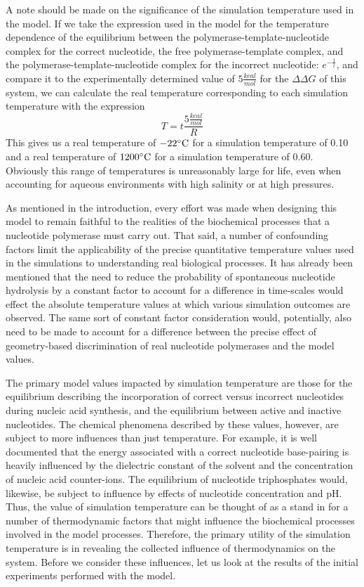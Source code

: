 A note should be made on the significance of the simulation temperature used in the model. If we take the expression used in the model for the temperature dependence of the equilibrium between the polymerase-template-nucleotide complex for the correct nucleotide, the free polymerase-template complex, and the polymerase-template-nucleotide complex for the incorrect nucleotide: $e^{-\frac{1}{t}}$, and compare it to the experimentally determined value of $5 \frac{kcal}{mol}$ for the $\Delta\Delta G$ of this system, we can calculate the real temperature corresponding to each simulation temperature with the expression\[
	T = t \frac{5\frac{kcal}{mol}}{R}
\]
This gives us a real temperature of $-22^\circ \rm{C}$ for a simulation temperature of 0.10 and a real temperature of $1200^\circ \rm{C}$ for a simulation temperature of 0.60. Obviously this range of temperatures is unreasonably large for life, even when accounting for aqueous environments with high salinity or at high pressures.

As mentioned in the introduction, every effort was made when designing this model to remain faithful to the realities of the biochemical processes that a nucleotide polymerase must carry out. That said, a number of confounding factors limit the applicability of the precise quantitative temperature values used in the simulations to understanding real biological processes. It has already been mentioned that the need to reduce the probability of spontaneous nucleotide hydrolysis by a constant factor to account for a difference in time-scales would effect the absolute temperature values at which various simulation outcomes are observed. The same sort of constant factor consideration would, potentially, also need to be made to account for a difference between the precise effect of geometry-based discrimination of real nucleotide polymerases and the model values.

The primary model values impacted by simulation temperature are those for the equilibrium describing the incorporation of correct versus incorrect nucleotides during nucleic acid synthesis, and the equilibrium between active and inactive nucleotides. The chemical phenomena described by these values, however, are subject to more influences than just temperature. For example, it is well documented that the energy associated with a correct nucleotide base-pairing is heavily influenced by the dielectric constant of the solvent and the concentration of nucleic acid counter-ions. The equilibrium of nucleotide triphosphates would, likewise, be subject to influence by effects of nucleotide concentration and pH. Thus, the value of simulation temperature can be thought of as a stand in for a number of thermodynamic factors that might influence the biochemical processes involved in the model processes. Therefore, the primary utility of the simulation temperature is in revealing the collected influence of thermodynamics on the system. Before we consider these influences, let us look at the results of the initial experiments performed with the model.


